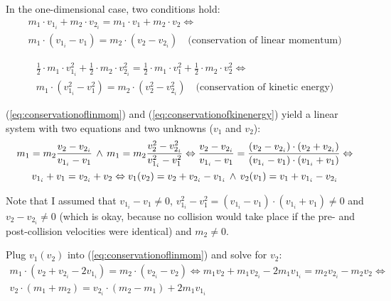 \documentclass[math,plainoldenumerate,afour]{homework}
\begin{document}
In the one-dimensional case, two conditions hold:
\begin{equation}
  \begin{split}
    m_1\cdot v_{1_i}+m_2\cdot v_{2_i}=
    m_1\cdot v_1+m_2\cdot v_2
    \Leftrightarrow \\
    m_1\cdot\left(v_{1_i}-v_1\right)=
    m_2\cdot\left(v_2-v_{2_i}\right)
    \quad\text{(conservation of linear momentum)}
    \label{eq:conservationoflinmom}
  \end{split}
\end{equation}

\begin{equation}
  \begin{split}
    \frac{1}{2}\cdot m_1\cdot v_{1_i}^2+\frac{1}{2}\cdot m_2\cdot v_{2_i}^2
    =\frac{1}{2}\cdot m_1\cdot v_1^2+\frac{1}{2}\cdot m_2\cdot v_2^2
    \Leftrightarrow \\
    m_1\cdot\left(v_{1_i}^2-v_1^2\right)=
    m_2\cdot\left(v_2^2-v_{2_i}^2\right)
    \quad\text{(conservation of kinetic energy)} 
    \label{eq:conservationofkinenergy}
  \end{split}
\end{equation}

(\ref{eq:conservationoflinmom}) and (\ref{eq:conservationofkinenergy})
yield a linear system with two equations and two unknowns ($v_1$ and $v_2$):
\begin{multline*}
  m_1 = m_2\frac{v_2-v_{2_i}}{v_{1_i}-v_1}
  \,\wedge\,
  m_1 = m_2\frac{v_2^2-v_{2_i}^2}{v_{1_i}^2-v_1^2}
  \Leftrightarrow
  \frac{v_2-v_{2_i}}{v_{1_i}-v_1}
  = \frac{(v_2-v_{2_i})\cdot(v_2+v_{2_i})}{(v_{1_i}-v_1)\cdot(v_{1_i}+v_1)}
  \Leftrightarrow \\
  v_{1_i}+v_1 = v_{2_i}+v_2
  \Leftrightarrow
  v_1(v_2) = v_2+v_{2_i}-v_{1_i}\,\wedge\,
  v_2(v_1) = v_1+v_{1_i}-v_{2_i}
\end{multline*}

Note that I assumed that $v_{1_i}-v_1\not=0$, $v_{1_i}^2-v_1^2 =
(v_{1_i}-v_1)\cdot(v_{1_i}+v_1)\not=0$ and $v_2-v_{2_i}\not = 0$ (which is
okay, because no collision would take place if the pre- and post-collision
velocities were identical) and $m_2\not = 0$.

Plug $v_1(v_2)$ into (\ref{eq:conservationoflinmom}) and solve for $v_2$:
\begin{equation*}
  \begin{split}
    m_1\cdot(v_2+v_{2_i}-2v_{1_i})=m_2\cdot(v_{2_i}-v_2)
    \Leftrightarrow
    m_1v_2 +m_1v_{2_i}-2m_1v_{1_i}=m_2v_{2_i}-m_2v_2
    \Leftrightarrow \\
    v_2\cdot(m_1+m_2)=v_{2_i}\cdot(m_2-m_1)+2m_1v_{1_i}
  \end{split}
\end{equation*}
\end{document}
